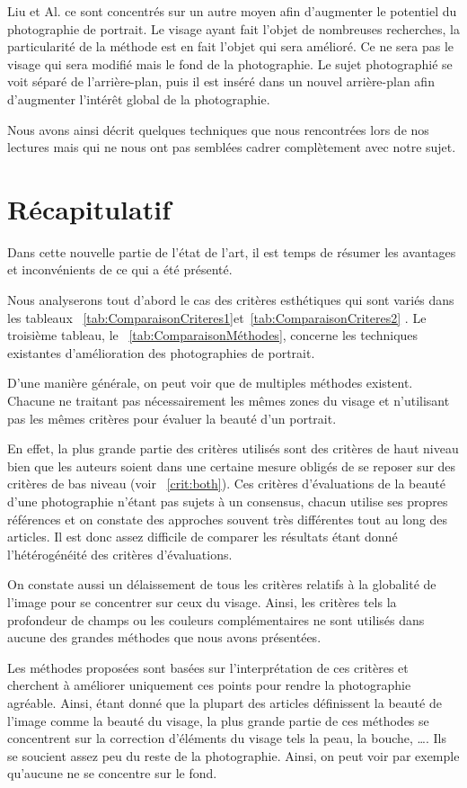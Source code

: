 \documentclass[11pt, french]{report-rd-info}
\begin{document}
Liu et Al. \cite{Liu2007} ce sont concentrés sur un autre moyen afin d’augmenter le potentiel du photographie de portrait. Le visage ayant fait l’objet de nombreuses recherches, la particularité de la méthode est en fait l’objet qui sera amélioré. Ce ne sera pas le visage qui sera modifié mais le fond de la photographie. Le sujet photographié se voit séparé de l’arrière-plan, puis il est inséré dans un nouvel arrière-plan afin d’augmenter l’intérêt global de la photographie.

Nous avons ainsi décrit quelques techniques que nous rencontrées lors de nos lectures mais qui ne nous ont pas semblées cadrer complètement avec notre sujet.
\section{Récapitulatif}
Dans cette nouvelle partie de l'état de l'art, il est temps de résumer les avantages et inconvénients de ce qui a été présenté.

Nous analyserons tout d'abord le cas des critères esthétiques
qui sont variés dans les tableaux ~\ref{tab:ComparaisonCriteres1}et~\ref{tab:ComparaisonCriteres2} . Le troisième tableau, le ~\ref{tab:ComparaisonMéthodes},
concerne les techniques existantes d'amélioration des photographies de portrait.

D’une manière générale, on peut voir que de multiples méthodes existent. Chacune ne traitant pas nécessairement les mêmes zones du visage et n’utilisant pas les mêmes critères pour évaluer la beauté d’un portrait.

En effet, la plus grande partie des critères utilisés sont des critères de haut niveau bien que les auteurs soient dans une certaine mesure obligés de se reposer sur des critères de bas niveau (voir ~\ref{crit:both}). Ces critères d’évaluations de la beauté d’une photographie n’étant pas sujets à un consensus, chacun utilise ses propres références et on constate des approches souvent très différentes tout au long des articles. Il est donc assez difficile de comparer les résultats étant donné l’hétérogénéité des critères d’évaluations.

On constate aussi un délaissement de tous les critères relatifs à la globalité de l’image pour se concentrer sur ceux du visage. Ainsi, les critères tels la profondeur de champs ou les couleurs complémentaires ne sont utilisés dans aucune des grandes méthodes que nous avons présentées.

Les méthodes proposées sont basées sur l’interprétation de ces critères et cherchent à améliorer uniquement ces points pour rendre la photographie agréable. Ainsi, étant donné que la plupart des articles définissent la beauté de l’image comme la beauté du visage, la plus grande partie de ces méthodes se concentrent sur la correction d’éléments du visage tels la peau, la bouche, \ldots. Ils se soucient assez peu du reste de la photographie. Ainsi, on peut voir par exemple qu’aucune ne se concentre sur le fond.
\end{document}
